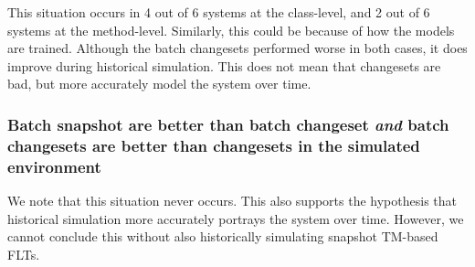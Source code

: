 %

This situation occurs in
4 out of 6 systems at the class-level, and
2 out of 6 systems at the method-level.
Similarly, this could be because of how the models are trained.
Although the batch changesets performed worse in both cases, it does
improve during historical simulation.
This does not mean that changesets are bad, but more accurately model
the system over time.

\subsubsection{Batch snapshot are better than batch changeset
\emph{and} batch changesets are better than changesets in the simulated environment}

%
%
We note that this situation never occurs.
This also supports the hypothesis that historical simulation more accurately portrays the system over time.
However, we cannot conclude this without also historically simulating snapshot TM-based FLTs.
